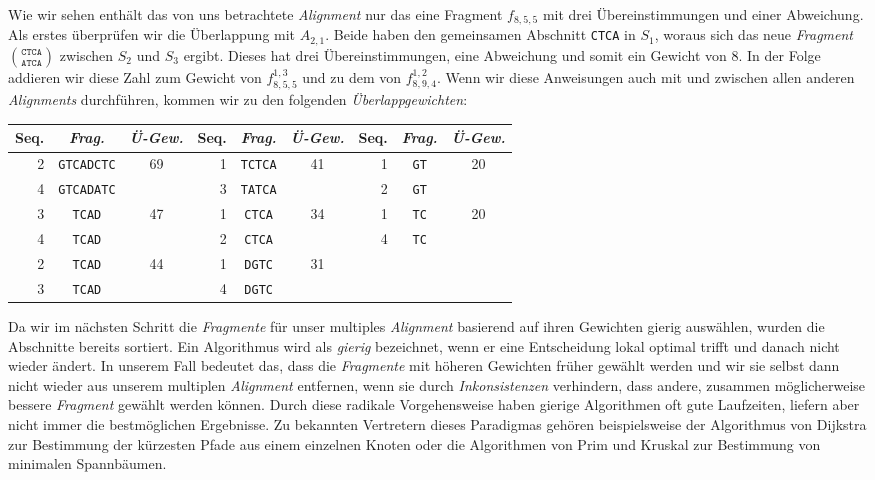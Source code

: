 Wie wir sehen enthält das von uns betrachtete \emph{Alignment} nur das eine Fragment $f_{8,5,5}$ mit drei Übereinstimmungen und einer Abweichung. Als erstes überprüfen wir die Überlappung mit $A_{2,1}$. Beide haben den gemeinsamen Abschnitt \texttt{CTCA} in $S_1$, woraus sich das neue \emph{Fragment} ${\texttt{CTCA}}\choose{\texttt{ATCA}}$ zwischen $S_2$ und $S_3$ ergibt. Dieses hat drei Übereinstimmungen, eine Abweichung und somit ein Gewicht von 8. In der Folge addieren wir diese Zahl zum Gewicht von $f_{8,5,5}^{1,3}$ und zu dem von $f_{8,9,4}^{1,2}$. Wenn wir diese Anweisungen auch mit und zwischen allen anderen \emph{Alignments} durchführen, kommen wir zu den folgenden \emph{Überlappgewichten}:

\begin{tabular}{r|c|c||r|c|c||r|c|c}
	Seq. & \emph{Frag.} & \emph{Ü-Gew.} & Seq. & \emph{Frag.} & \emph{Ü-Gew.} & Seq. & \emph{Frag.} & \emph{Ü-Gew.}\\
	\hline
	2 & \texttt{GTCADCTC} & \multirow{2}{*}{69} & 1 & \texttt{TCTCA} & \multirow{2}{*}{41} & 1 & \texttt{GT} &\multirow{2}{*}{20} \\
	4 & \texttt{GTCADATC} &                     & 3 & \texttt{TATCA} &                     & 2 & \texttt{GT} & \\
	3 & \texttt{TCAD} & \multirow{2}{*}{47} & 1 & \texttt{CTCA} & \multirow{2}{*}{34} & 1 & \texttt{TC} & \multirow{2}{*}{20} \\
	4 & \texttt{TCAD} &                     & 2 & \texttt{CTCA} &                          & 4 & \texttt{TC} & \\
	2 & \texttt{TCAD} & \multirow{2}{*}{44} & 1 & \texttt{DGTC} & \multirow{2}{*}{31} &    &   & \\
    3 & \texttt{TCAD} &                     & 4 & \texttt{DGTC} &                     &    &   & \\
\end{tabular}

Da wir im nächsten Schritt die \emph{Fragmente} für unser multiples \emph{Alignment} basierend auf ihren Gewichten gierig auswählen, wurden die Abschnitte bereits sortiert. Ein Algorithmus wird als \emph{gierig} bezeichnet, wenn er eine Entscheidung lokal optimal trifft und danach nicht wieder ändert. In unserem Fall bedeutet das, dass die \emph{Fragmente} mit höheren Gewichten früher gewählt werden und wir sie selbst dann nicht wieder aus unserem multiplen \emph{Alignment} entfernen, wenn sie durch \emph{Inkonsistenzen} verhindern, dass andere, zusammen möglicherweise bessere \emph{Fragment} gewählt werden können. Durch diese radikale Vorgehensweise haben gierige Algorithmen oft gute Laufzeiten, liefern aber nicht immer die bestmöglichen Ergebnisse. Zu bekannten Vertretern dieses Paradigmas gehören beispielsweise der Algorithmus von Dijkstra zur Bestimmung der kürzesten Pfade aus einem einzelnen Knoten oder die Algorithmen von Prim und Kruskal zur Bestimmung von minimalen Spannbäumen.

